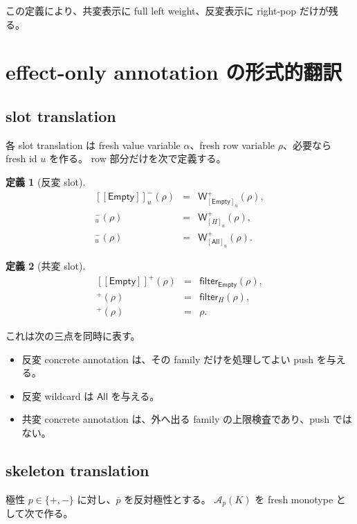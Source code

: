 \documentclass[uplatex,dvipdfmx,a4paper,10.5pt]{jsarticle}
\theoremstyle{jpplain}
\newtheorem{definition}{定義}[section]
\newcommand{\All}{\mathsf{All}}
\newcommand{\Empty}{\mathsf{Empty}}
\newcommand{\Filter}[2]{\mathsf{filter}_{#1}(#2)}
\newcommand{\PWeight}[2]{\mathsf{W}^{+}_{#1}(#2)}
\newcommand{\takeop}[2]{[#1]_{#2}}
\newcommand{\sem}[1]{[\![#1]\!]}
\begin{document}
この定義により、共変表示に full left weight、反変表示に right-pop だけが残る。

\section{effect-only annotation の形式的翻訳}

\subsection{slot translation}

各 slot translation は fresh value variable $\alpha$、fresh row variable $\rho$、必要なら fresh id $u$ を作る。
row 部分だけを次で定義する。

\begin{definition}[反変 slot]
\[
\begin{array}{rcl}
\sem{\Empty}^-_u(\rho)&=&\PWeight{\takeop{\Empty}{u}}{\rho},\\
\sem{H}^-_u(\rho)&=&\PWeight{\takeop{H}{u}}{\rho},\\
\sem{\ast}^-_u(\rho)&=&\PWeight{\takeop{\All}{u}}{\rho}.
\end{array}
\]
\end{definition}

\begin{definition}[共変 slot]
\[
\begin{array}{rcl}
\sem{\Empty}^+(\rho)&=&\Filter{\Empty}{\rho},\\
\sem{H}^+(\rho)&=&\Filter{H}{\rho},\\
\sem{\ast}^+(\rho)&=&\rho.
\end{array}
\]
\end{definition}

これは次の三点を同時に表す。

\begin{itemize}
  \item 反変 concrete annotation は、その family だけを処理してよい push を与える。
  \item 反変 wildcard は $\All$ を与える。
  \item 共変 concrete annotation は、外へ出る family の上限検査であり、push ではない。
\end{itemize}

\subsection{skeleton translation}

極性 $p\in\{+,-\}$ に対し、$\overline{p}$ を反対極性とする。
$\mathcal A_p(K)$ を fresh monotype として次で作る。
\end{document}
